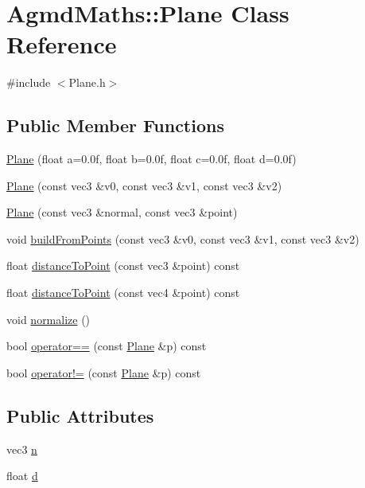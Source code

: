 \hypertarget{class_agmd_maths_1_1_plane}{\section{Agmd\+Maths\+:\+:Plane Class Reference}
\label{class_agmd_maths_1_1_plane}
}


{\ttfamily \#include $<$Plane.\+h$>$}

\subsection*{Public Member Functions}
\begin{DoxyCompactItemize}
\item 
\hyperlink{class_agmd_maths_1_1_plane_a368d0a04122fe6a3b9587cae61e51a01}{Plane} (float a=0.\+0f, float b=0.\+0f, float c=0.\+0f, float d=0.\+0f)
\item 
\hyperlink{class_agmd_maths_1_1_plane_a27dc7a8bbf6b0e5c9b18ac47b3019500}{Plane} (const vec3 \&v0, const vec3 \&v1, const vec3 \&v2)
\item 
\hyperlink{class_agmd_maths_1_1_plane_aa07f96daa023e5f5353a004fad0a21da}{Plane} (const vec3 \&normal, const vec3 \&point)
\item 
void \hyperlink{class_agmd_maths_1_1_plane_ab01be5c7a65081a8802f4be5f451a216}{build\+From\+Points} (const vec3 \&v0, const vec3 \&v1, const vec3 \&v2)
\item 
float \hyperlink{class_agmd_maths_1_1_plane_a6cbcc17b27bb10df5296185f75c531cd}{distance\+To\+Point} (const vec3 \&point) const 
\item 
float \hyperlink{class_agmd_maths_1_1_plane_aae3f5ca69e8a4fbd2b5d0351539c57c9}{distance\+To\+Point} (const vec4 \&point) const 
\item 
void \hyperlink{class_agmd_maths_1_1_plane_a6e73a6db0f74741d99f1fc3d5e56dec3}{normalize} ()
\item 
bool \hyperlink{class_agmd_maths_1_1_plane_a7750b5e3c7363d831e64ec729a7121b4}{operator==} (const \hyperlink{class_agmd_maths_1_1_plane}{Plane} \&p) const 
\item 
bool \hyperlink{class_agmd_maths_1_1_plane_ae086a31aa81073429b9af09c2dde70b4}{operator!=} (const \hyperlink{class_agmd_maths_1_1_plane}{Plane} \&p) const 
\end{DoxyCompactItemize}
\subsection*{Public Attributes}
\begin{DoxyCompactItemize}
\item 
vec3 \hyperlink{class_agmd_maths_1_1_plane_a0b45b5f1795f8d8b08aef61c45d0c72e}{n}
\item 
float \hyperlink{class_agmd_maths_1_1_plane_a2dcb3b56f27ca1b2ce4997e9a13fb645}{d}
\end{DoxyCompactItemize}


